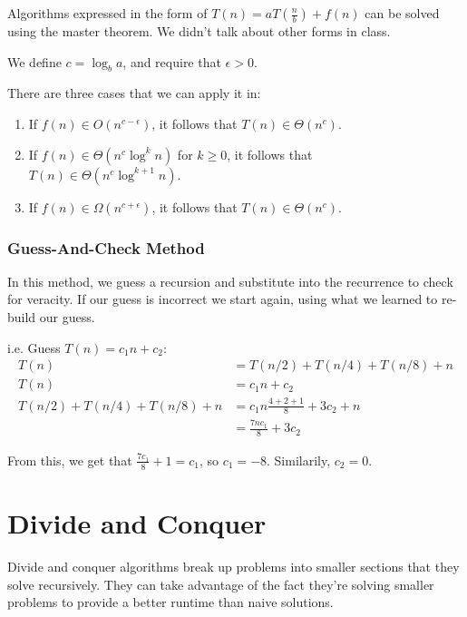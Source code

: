             Algorithms expressed in the form of
            $T(n) = a T\left( \frac{n}{b} \right) + f(n)$ can be solved using
            the master theorem. We didn't talk about other forms in class.

            We define $c = \log_b{a}$, and require that $\epsilon > 0$.

            There are three cases that we can apply it in:
            \begin{enumerate}
                \item If $f(n) \in O(n^{c-\epsilon})$, it follows that
                    $T(n) \in \Theta(n^c)$.
                \item If $f(n) \in \Theta(n^c \log^k n)$ for $k \ge 0$, it
                    follows that $T(n) \in \Theta(n^c \log^{k+1}n)$.
                \item If $f(n) \in \Omega(n^{c+\epsilon})$, it follows that
                    $T(n) \in \Theta(n^c)$.
             \end{enumerate}
        \subsection{Guess-And-Check Method}
            In this method, we guess a recursion and substitute into the
            recurrence to check for veracity.
            If our guess is incorrect we start again, using what we learned to
            re-build our guess.

            i.e.
            Guess $T(n) = c_1 n + c_2$:
            \begin{align*}
                T(n) &= T(n/2) + T(n/4) + T(n/8) + n \\
                T(n) &= c_1 n + c_2 \\
                T(n/2) + T(n/4) + T(n/8) + n &= c_1 n\frac{4+2+1}{8} + 3 c_2 + n\\
                &= \frac{7 n c_1}{8} + 3 c_2
            \end{align*}

            From this, we get that $\frac{7c_1}{8} + 1 = c_1$, so $c_1 = -8$.
            Similarily, $c_2 = 0$.

\chapter{Divide and Conquer}
    Divide and conquer algorithms break up problems into smaller sections that
    they solve recursively. They can take advantage of the fact they're solving
    smaller problems to provide a better runtime than naive solutions.

